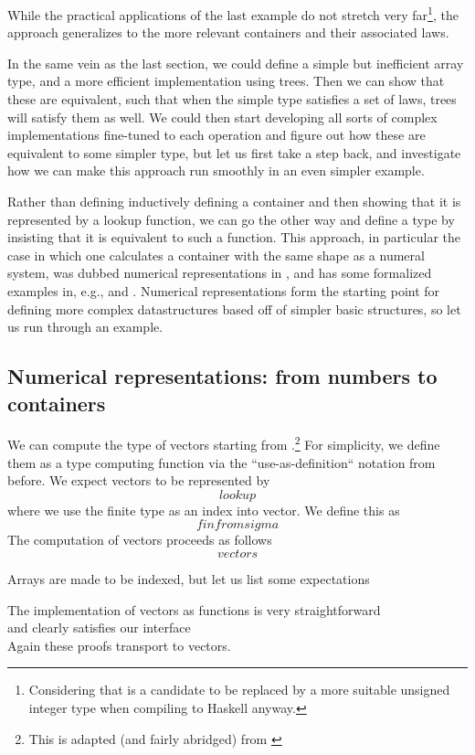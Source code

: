 \documentclass[Main.tex]{subfiles}
\begin{document}
While the practical applications of the last example do not stretch very far\footnote{Considering that  is a candidate to be replaced by a more suitable unsigned integer type when compiling to Haskell anyway.}, the approach generalizes to the more relevant containers and their associated laws.

In the same vein as the last section, we could define a simple but inefficient array type, and a more efficient implementation using trees. Then we can show that these are equivalent, such that when the simple type satisfies a set of laws, trees will satisfy them as well. We could then start developing all sorts of complex implementations fine-tuned to each operation and figure out how these are equivalent to some simpler type, but let us first take a step back, and investigate how we can make this approach run smoothly in an even simpler example.

Rather than defining inductively defining a container and then showing that it is represented by a lookup function, we can go the other way and define a type by insisting that it is equivalent to such a function. This approach, in particular the case in which one calculates a container with the same shape as a numeral system, was dubbed numerical representations in \cite{purelyfunctional}, and has some formalized examples in, e.g., \cite{calcdata} and \cite{progorn}. Numerical representations form the starting point for defining more complex datastructures based off of simpler basic structures, so let us run through an example.

\subsection{Numerical representations: from numbers to containers}
We can compute the type of vectors starting from \bN{}.\footnote{This is adapted (and fairly abridged) from \cite{calcdata}} For simplicity, we define them as a type computing function via the ``use-as-definition`` notation from before. We expect vectors to be represented by 
\[ lookup \]
where we use the finite type  as an index into vector. We define this as
\[ finfromsigma \]
The computation of vectors proceeds as follows
\[ vectors \]


Arrays are made to be indexed, but let us list some expectations

The implementation of vectors as functions is very straightforward
\[ \]
and clearly satisfies our interface
\[ \]
Again these proofs transport to vectors.
\end{document}
